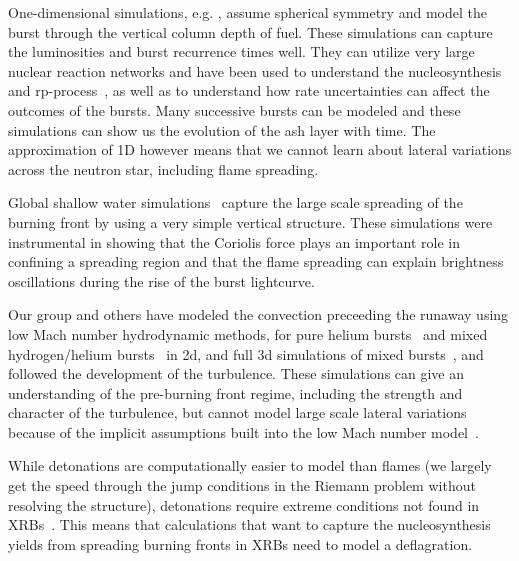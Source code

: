 \documentclass[a4paper]{jpconf}
\begin{document}
One-dimensional simulations, e.g. \cite{woosley-xrb,fisker:2008}, assume
spherical symmetry and model the burst through the vertical column
depth of fuel.  These simulations can capture the luminosities and
burst recurrence times well.  They can utilize very large nuclear
reaction networks and have been used to understand the nucleosynthesis
and rp-process~\cite{shatz_rp}, as well as to understand how rate uncertainties can
affect the outcomes of the bursts.  Many successive bursts can be
modeled and these simulations can show us the evolution of the ash
layer with time.  The approximation of 1D however means that we cannot
learn about lateral variations across the neutron star, including
flame spreading.

Global shallow water simulations~\cite{SPIT_ETAL02} capture the
large scale spreading of the burning front by using a very simple
vertical structure.  These simulations were instrumental in showing
that the Coriolis force plays an important role in confining a
spreading region and that the flame spreading can explain brightness
oscillations during the rise of the burst lightcurve.

Our group and others have modeled the convection preceeding the
runaway using low Mach number hydrodynamic methods, for pure helium
bursts~\cite{Lin:2006,xrb} and mixed hydrogen/helium
bursts~\cite{xrb2} in 2d, and full 3d simulations of mixed
bursts~\cite{xrb3}, and followed the development of the turbulence.
These simulations can give an understanding of the pre-burning front
regime, including the strength and character of the turbulence, but
cannot model large scale lateral variations because of the implicit
assumptions built into the low Mach number model~\cite{ABRZ:I}.

While detonations are computationally easier to model than flames (we
largely get the speed through the jump conditions in the Riemann
problem without resolving the structure), detonations require extreme
conditions not found in XRBs~\cite{ZINGALE_ETAL01,harpole:2018}.
This means that calculations that want to capture the nucleosynthesis
yields from spreading burning fronts in XRBs need to model a deflagration.
\end{document}
